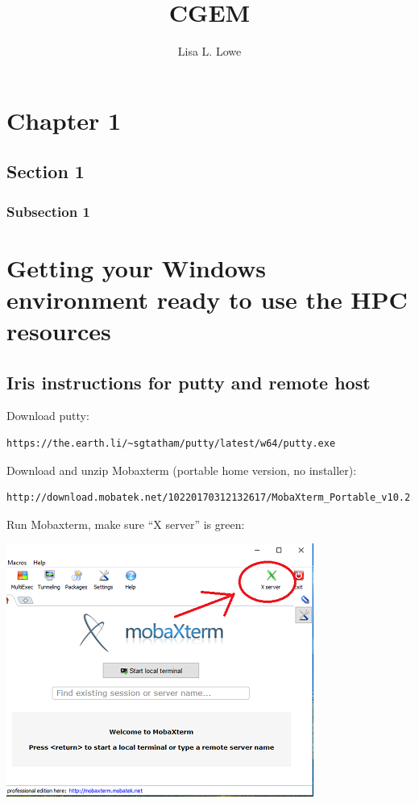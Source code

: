 \documentclass[12pt,letterpaper]{memoir} %
\title{CGEM}
\author{Lisa L. Lowe}
\begin{document}
\setverbatimfont{\normalfont\ttfamily}

\maketitle
\tableofcontents* %

\chapter{Chapter 1}
\section{Section 1}
\subsection{Subsection 1}


\appendix

\chapter{Getting your Windows environment ready to use the HPC resources}



\section{Iris instructions for putty and remote host}

Download putty: 

\begin{verbatim}https://the.earth.li/~sgtatham/putty/latest/w64/putty.exe \end{verbatim}

Download and unzip Mobaxterm (portable home version, no installer): 
\begin{verbatim}http://download.mobatek.net/10220170312132617/MobaXterm_Portable_v10.2.zip\end{verbatim}

Run Mobaxterm, make sure “X server” is green:
\begin{center}
\includegraphics{Figures/App1/Env/Moba.PNG}
\end{center}
\end{document}
